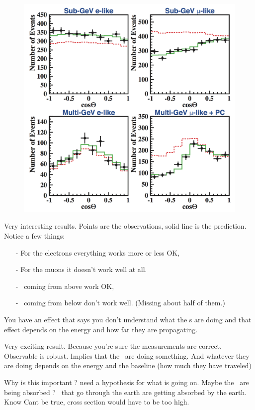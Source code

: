 {\begin{figure}[h!]
\centering
\includegraphics[width=1.0\textwidth]{./sk.png}
\end{figure}
\clearpage

Very interesting results.
Points are the observations, solid line is the prediction.
Notice a few things:
\begin{itemize}
\item[-] For the electrons everything works more or less OK, 
\item[-] For the muons it doesn't work well at all.
\item[-] \nus\ coming from above work OK, 
\item[-] \nus\ coming from below don't work well. (Missing about half of them.)
\end{itemize}
You have an effect that says you don't understand what the \numu s are doing and that effect depends on the energy and how far they are propagating.


Very exciting result. 
Because you're sure the measurements are correct. 
Observable is robust. 
Implies that the \nus\ are doing something. 
And whatever they are doing depends on the energy and the baseline (how much they have traveled)

Why is this important ? need a hypothesis for what is going on. 
Maybe the \nus\ are being absorbed ? 
\nus\ that go through the earth are getting absorbed by the earth. 
Know Cant be true,  cross section would have to be too high. 

}
